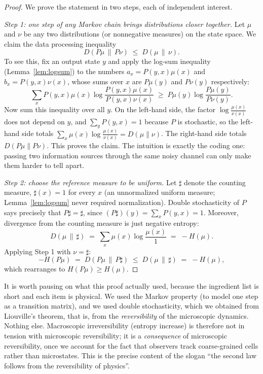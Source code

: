 \documentclass[10pt]{article}
\theoremstyle{definition}
\theoremstyle{remark}
\begin{document}
\begin{proof}
We prove the statement in two steps, each of independent interest.

\emph{Step 1: one step of any Markov chain brings distributions closer together.} Let $\mu$ and $\nu$ be any two distributions (or nonnegative measures) on the state space. We claim the data processing inequality
\[
D(P\mu \,\|\, P\nu) \;\le\; D(\mu \,\|\, \nu).
\]
To see this, fix an output state $y$ and apply the log-sum inequality (Lemma~\ref{lem:logsum}) to the numbers $a_x = P(y,x)\mu(x)$ and $b_x = P(y,x)\nu(x)$, whose sums over $x$ are $P\mu(y)$ and $P\nu(y)$ respectively:
\[
\sum_x P(y,x)\mu(x) \log \frac{P(y,x)\mu(x)}{P(y,x)\nu(x)} \;\ge\; P\mu(y) \log \frac{P\mu(y)}{P\nu(y)}.
\]
Now sum this inequality over all $y$. On the left-hand side, the factor $\log\frac{\mu(x)}{\nu(x)}$ does not depend on $y$, and $\sum_y P(y,x) = 1$ because $P$ is stochastic, so the left-hand side totals $\sum_x \mu(x)\log\frac{\mu(x)}{\nu(x)} = D(\mu\|\nu)$. The right-hand side totals $D(P\mu \| P\nu)$. This proves the claim. The intuition is exactly the coding one: passing two information sources through the same noisy channel can only make them harder to tell apart.

\emph{Step 2: choose the reference measure to be uniform.} Let $\sharp$ denote the counting measure, $\sharp(x) = 1$ for every $x$ (an unnormalized uniform measure; Lemma~\ref{lem:logsum} never required normalization). Double stochasticity of $P$ says precisely that $P\sharp = \sharp$, since $(P\sharp)(y) = \sum_x P(y,x) = 1$. Moreover, divergence from the counting measure is just negative entropy:
\[
D(\mu \,\|\, \sharp) \;=\; \sum_x \mu(x) \log \frac{\mu(x)}{1} \;=\; -H(\mu).
\]
Applying Step 1 with $\nu = \sharp$:
\[
-H(P\mu) \;=\; D(P\mu \,\|\, P \sharp) \;\le\; D(\mu \,\|\, \sharp) \;=\; -H(\mu),
\]
which rearranges to $H(P\mu) \ge H(\mu)$.
\end{proof}

It is worth pausing on what this proof actually used, because the ingredient list is short and each item is physical. We used the Markov property (to model one step as a transition matrix), and we used double stochasticity, which we obtained from Liouville's theorem, that is, from the \emph{reversibility} of the microscopic dynamics. Nothing else. Macroscopic irreversibility (entropy increase) is therefore not in tension with microscopic reversibility; it is a \emph{consequence} of microscopic reversibility, once we account for the fact that observers track coarse-grained cells rather than microstates. This is the precise content of the slogan ``the second law follows from the reversibility of physics''.
\end{document}
